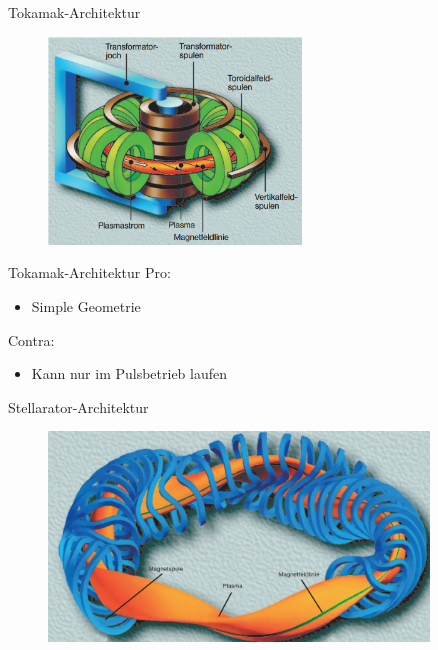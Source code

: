 \documentclass[aspectratio=169,xcolor=dvipsnames,14pt]{beamer}
\begin{document}
    \begin{frame}{Tokamak-Architektur}
        \begin{figure}
            \centering
            \includegraphics[width=0.6\textwidth]{Images/Tokamak.png}
        \end{figure}    
    \end{frame}

    \begin{frame}{Tokamak-Architektur}
        \color{LightGrey}
        Pro:
        \begin{itemize}
            \color{LightGrey}
            \item Simple Geometrie
        \end{itemize}
        Contra:
        \begin{itemize}
            \color{LightGrey}
            \item Kann nur im Pulsbetrieb laufen
        \end{itemize}
    \end{frame}
    \begin{frame}{Stellarator-Architektur}
        \begin{figure}
            \centering
            \includegraphics[width=0.9\textwidth]{Images/Stellarator.png}
        \end{figure}    
    \end{frame}
\end{document}
